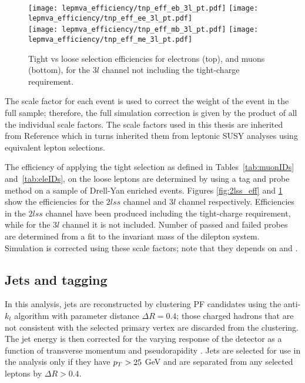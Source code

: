 \begin{figure}[!ht]
\centering
  \texttt{[image: lepmva\_efficiency/tnp\_eff\_eb\_3l\_pt.pdf]}
  \texttt{[image: lepmva\_efficiency/tnp\_eff\_ee\_3l\_pt.pdf]}\\
  \texttt{[image: lepmva\_efficiency/tnp\_eff\_mb\_3l\_pt.pdf]}
  \texttt{[image: lepmva\_efficiency/tnp\_eff\_me\_3l\_pt.pdf]}
\caption[Tight vs loose lepton selection efficiencies in the $3l$ channel.]{Tight vs loose selection efficiencies for electrons (top), and muons (bottom), for the $3l$ channel not including the tight-charge requirement.}
\label{fig:3l_eff}
\end{figure}

The scale factor for each event is used to correct the weight of the event in the full sample; therefore, the full simulation correction is given by the product of all the individual scale factors. The scale factors used in this thesis are inherited from Reference \cite{CMS_AN_2017-029} which in turns inherited them from leptonic SUSY analyses using equivalent lepton selections.

The efficiency of applying the tight selection as defined in Tables~\ref{tab:muonIDs} and~\ref{tab:eleIDs}, on the loose leptons are determined by using a tag and probe method on a sample of Drell-Yan enriched events. Figures \ref{fig:2lss_eff} and \ref{fig:3l_eff} show the efficiencies for the $2lss$ channel and $3l$ channel respectively. Efficiencies in the $2lss$ channel have been produced including the tight-charge requirement, while for the $3l$ channel it is not included. Number of passed and failed probes are determined from a fit to the invariant mass of the dilepton system. Simulation is corrected using these scale factors; note that they depends on \etac and \pt.   

\subsection{Jets and \bjet tagging}

In this analysis, jets are reconstructed by clustering PF candidates using the anti-$k_t$ algorithm with parameter distance $\Delta R=0.4$; those charged hadrons that are not consistent with the selected primary vertex are discarded from the clustering. The jet energy is then corrected for the varying response of the detector as a function of transverse momentum \pt and pseudorapidity \etac. Jets are selected for use in the analysis only if they have $p_T > 25$ GeV and are separated from any selected leptons by $\Delta R > 0.4$.

